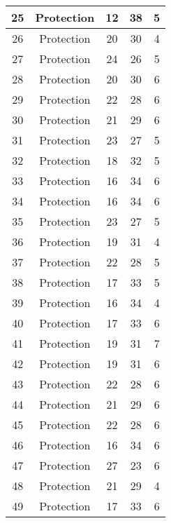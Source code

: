 \documentclass[results.tex]{subfiles}
\begin{document}
\begin{center}
\begin{tabular}{| c || c | c | c | c |}
    \hline
    25 & Protection & 12 & 38 & 5 \\ 
    \hline
    26 & Protection & 20 & 30 & 4 \\ 
    \hline
    27 & Protection & 24 & 26 & 5 \\ 
    \hline
    28 & Protection & 20 & 30 & 6 \\ 
    \hline
    29 & Protection & 22 & 28 & 6 \\ 
    \hline
    30 & Protection & 21 & 29 & 6 \\ 
    \hline
    31 & Protection & 23 & 27 & 5 \\ 
    \hline
    32 & Protection & 18 & 32 & 5 \\ 
    \hline
    33 & Protection & 16 & 34 & 6 \\ 
    \hline
    34 & Protection & 16 & 34 & 6 \\ 
    \hline
    35 & Protection & 23 & 27 & 5 \\ 
    \hline
    36 & Protection & 19 & 31 & 4 \\ 
    \hline
    37 & Protection & 22 & 28 & 5 \\ 
    \hline
    38 & Protection & 17 & 33 & 5 \\ 
    \hline
    39 & Protection & 16 & 34 & 4 \\ 
    \hline
    40 & Protection & 17 & 33 & 6 \\ 
    \hline
    41 & Protection & 19 & 31 & 7 \\ 
    \hline
    42 & Protection & 19 & 31 & 6 \\ 
    \hline
    43 & Protection & 22 & 28 & 6 \\ 
    \hline
    44 & Protection & 21 & 29 & 6 \\ 
    \hline
    45 & Protection & 22 & 28 & 6 \\ 
    \hline
    46 & Protection & 16 & 34 & 6 \\ 
    \hline
    47 & Protection & 27 & 23 & 6 \\ 
    \hline
    48 & Protection & 21 & 29 & 4 \\ 
    \hline
    49 & Protection & 17 & 33 & 6 \\ 
    \hline   \end{tabular}
\end{center}
\end{document}

